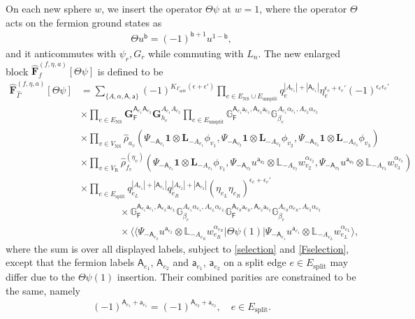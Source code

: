 \documentclass[12pt]{article}
\def\ie{\begin{equation}\begin{aligned}}
\def\fe{\end{aligned}\end{equation}}
\def\NS{\mathrm{NS}}
\def\R{\mathrm{R}}
\def\F{\mathsf{F}}
\begin{document}
On each new sphere $w$, we insert the operator $\Theta \psi$ at $w=1$, where the operator $\Theta$ acts on the fermion ground states as
\ie
\Theta u^{\mathsf{b}} = (-1)^{\mathsf{b}+1}u^{1-\mathsf{b}},
\fe
and it anticommutes with $\psi_r, G_r$ while commuting with $L_n$. The new enlarged block $\hat{\mathbf{F}}^{(f,\eta,a)}_f[\Theta\psi]$ is defined to be
\ie 
\widehat{\mathbf{F}}^{(f,\eta,a)}_{\hat{\Gamma}}[\Theta \psi] &= \sum_{\{A,\alpha,\mathsf{A},\mathsf{a}\}} (-1)^{K_{\Gamma_{\mathrm{split}}}(\epsilon+\epsilon')} \prod_{e\in E_\NS\cup E_{\mathrm{unsplit}}} q_e^{|A_{e_1}|+|\mathsf{A}_{e_1}|}\eta_e^{\epsilon_e+\epsilon_e'} (-1)^{\epsilon_e\epsilon_e'}\\
&\times \prod_{e\in E_\NS} \mathbf{G}_{\F}^{\mathsf{A}_{e_1}\mathsf{A}_{e_2}}  \mathbf{G}_{h_e}^{A_{e_1}A_{e_2}} \prod_{e\in E_{\mathrm{unsplit}}} \mathbb{G}_{\F}^{\mathsf{A}_{e_1}\mathsf{a}_{e_1},\mathsf{A}_{e_2}\mathsf{a}_{e_2}} \mathbb{G}_{\beta_e}^{A_{e_1}\alpha_{e_1},A_{e_2}\alpha_{e_2}}\\
&\times \prod_{v \in V_\NS} \hat{\rho}_{a_v}(\Psi_{-\mathsf{A}_{v_1}}\mathbf{1}\otimes \mathbf L_{-A_{v_1}}\phi_{v_1},\Psi_{-\mathsf{A}_{v_2}}\mathbf{1}\otimes \mathbf L_{-A_{v_2}}\phi_{v_2},\Psi_{-\mathsf{A}_{v_3}}\mathbf{1}\otimes \mathbf L_{-A_{v_3}}\phi_{v_3})\\
&\times\prod_{v\in V_\R}\hat{\rho}_{f_v}^{(\eta_v)}(\Psi_{-\mathsf{A}_{v_1}}\mathbf{1}\otimes \mathbf L_{-A_{v_1}}\phi_{v_1},\Psi_{-\mathsf{A}_{v_2}} u^{\mathsf{a_{v_2}}}\otimes\mathbb L_{-A_{v_2}}w_{v_2}^{\alpha_{v_2}},\Psi_{-\mathsf{A}_{v_3}} u^{\mathsf{a_{v_3}}}\otimes\mathbb L_{-A_{v_3}}w_{v_3}^{\alpha_{v_3}})\\
&\times \prod_{e\in E_\mathrm{split}} q_{e_L}^{|A_{e_1}|+|\mathsf{A}_{e_1}|}q_{e_R}^{|A_{e_2}|+|\mathsf{A}_{e_2}|}(\eta_{e_L}\eta_{e_R})^{\epsilon_e+\epsilon_e'}\\
&\qquad \qquad \times \mathbb{G}_{\F}^{\mathsf{A}_{e_1}\mathsf{a}_{e_1},\mathsf{A}_{e_L}\mathsf{a}_{e_L}} \mathbb{G}_{\beta_e}^{A_{e_1}\alpha_{e_1},A_{e_L}\alpha_{e_L}}\mathbb{G}_{\F}^{\mathsf{A}_{e_R}\mathsf{a}_{e_R},\mathsf{A}_{e_2}\mathsf{a}_{e_2}} \mathbb{G}_{\beta_e}^{A_{e_R}\alpha_{e_R},A_{e_2}\alpha_{e_2}}\\
&\qquad \qquad \times \langle \langle \Psi_{-\mathsf{A}_{e_2}}u^{\mathsf{a}_{e_2}}\otimes \mathbb{L}_{-A_{e_R}}w^{\alpha_{e_R}}_{e_R}|\Theta \psi(1)|\Psi_{-\mathsf{A}_{e_1}}u^{\mathsf{a}_{e_1}}\otimes \mathbb{L}_{-A_{e_L}}w^{\alpha_{e_L}}_{e_L}\rangle,
\fe
where the sum is over all displayed labels, subject to \eqref{selection} and \eqref{Fselection}, except that the fermion labels $\mathsf{A}_{e_1}$, $\mathsf{A}_{e_2}$ and $\mathsf{a}_{e_1}$, $\mathsf{a}_{e_2}$ on a split edge $e\in E_{\mathrm{split}}$ may differ due to the $\Theta\psi(1)$ insertion. Their combined parities are constrained to be the same, namely
\ie
(-1)^{\mathsf{A}_{e_1}+\mathsf{a}_{e_1}}=(-1)^{\mathsf{A}_{e_2}+\mathsf{a}_{e_2}},\quad e\in E_\mathrm{split}.
\fe
\end{document}
